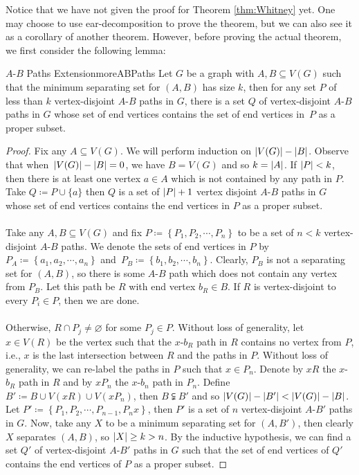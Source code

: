 \documentclass[math]{amznotes}
\theoremstyle{remark}
\newcommand{\0}{\mathbf{0}}
\newcommand{\1}{\mathbf{1}}
\begin{document}
Notice that we have not given the proof for Theorem \ref{thm:Whitney} yet. One may choose to use ear-decomposition to prove the theorem, but we can also see it as a corollary of another theorem. However, before proving the actual theorem, we first consider the following lemma:
\begin{lembox}{$A$-$B$ Paths Extension}{moreABPaths}
    Let $G$ be a graph with $A, B \subseteq V(G)$ such that the minimum separating set for $(A, B)$ has size $k$, then for any set $P$ of less than $k$ vertex-disjoint $A$-$B$ paths in $G$, there is a set $Q$ of vertex-disjoint $A$-$B$ paths in $G$ whose set of end vertices contains the set of end vertices in~$P$ as a proper subset.
    \tcblower
    \begin{proof}
        Fix any $A \subseteq V(G)$. We will perform induction on ${\left\lvert {V(G)} \right\rvert} - {\left\lvert {B} \right\rvert}$. Observe that when~${\left\lvert {V(G)} \right\rvert} - {\left\lvert {B} \right\rvert} = 0$, we have $B = V(G)$ and so $k = {\left\lvert {A} \right\rvert}$. If ${\left\lvert {P} \right\rvert} < k$, then there is at least one vertex $a \in A$ which is not contained by any path in $P$. Take $Q \coloneqq P \cup \{a\}$ then $Q$ is a set of ${\left\lvert {P} \right\rvert} + 1$ vertex disjoint $A$-$B$ paths in $G$ whose set of end vertices contains the end vertices in $P$ as a proper subset.
        \\\\
        Take any $A, B \subseteq V(G)$ and fix $P \coloneqq \left\{P_1, P_2, \cdots, P_n\right\}$ to be a set of $n < k$ vertex-disjoint $A$-$B$ paths. We denote the sets of end vertices in $P$ by $P_A \coloneqq \left\{a_1, a_2, \cdots, a_n\right\}$ and~$P_B \coloneqq \left\{b_1, b_2, \cdots, b_n\right\}$. Clearly, $P_B$ is not a separating set for $(A, B)$, so there is some $A$-$B$ path which does not contain any vertex from $P_B$. Let this path be $R$ with end vertex $b_R \in B$. If $R$ is vertex-disjoint to every $P_i \in P$, then we are done.
        \\\\
        Otherwise, $R \cap P_j \neq \varnothing$ for some $P_j \in P$. Without loss of generality, let $x \in V(R)$ be the vertex such that the $x$-$b_R$ path in $R$ contains no vertex from $P$, i.e., $x$ is the last intersection between $R$ and the paths in $P$. Without loss of generality, we can re-label the paths in $P$ such that $x \in P_n$. Denote by $xR$ the $x$-$b_R$ path in $R$ and by $xP_n$ the $x$-$b_n$ path in $P_n$. Define $B' \coloneqq B \cup V(xR) \cup V(xP_n)$, then $B \subsetneqq B'$ and so ${\left\lvert {V(G)} \right\rvert} - {\left\lvert {B'} \right\rvert} < {\left\lvert {V(G)} \right\rvert} - {\left\lvert {B} \right\rvert}$. Let $P' \coloneqq \left\{P_1, P_2, \cdots, P_{n - 1}, P_nx\right\}$, then $P'$ is a set of $n$ vertex-disjoint $A$-$B'$ paths in $G$. Now, take any $X$ to be a minimum separating set for $(A, B')$, then clearly $X$ separates $(A, B)$, so ${\left\lvert {X} \right\rvert} \geq k > n$. By the inductive hypothesis, we can find a set $Q'$ of vertex-disjoint $A$-$B'$ paths in $G$ such that the set of end vertices of $Q'$ contains the end vertices of $P$ as a proper subset.

\end{proof}
\end{lembox}
\end{document}
